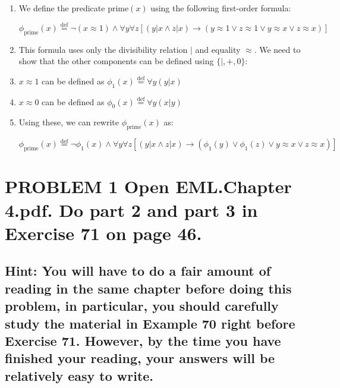 \documentclass{article}
\newenvironment{proof}
{\begin{mdframed}[linewidth=0.5pt]\begin{enumerate}[label=\arabic*.,leftmargin=*]}
{\end{enumerate}\end{mdframed}}
\newcommand{\defeq}{\stackrel{\text{def}}{=}}
\begin{document}
\begin{proof}
    \item We define the predicate $\text{prime}(x)$ using the following first-order formula:
    
    \[\phi_{\text{prime}}(x) \defeq \neg(x \approx 1) \wedge \forall y \forall z [(y|x \wedge z|x) \to (y \approx 1 \vee z \approx 1 \vee y \approx x \vee z \approx x)]\]
    
    \item This formula uses only the divisibility relation $|$ and equality $\approx$. We need to show that the other components can be defined using $\{|, +, 0\}$:
    
    \item $x \approx 1$ can be defined as $\phi_1(x) \defeq \forall y (y|x)$
    
    \item $x \approx 0$ can be defined as $\phi_0(x) \defeq \forall y (x|y)$
    
    \item Using these, we can rewrite $\phi_{\text{prime}}(x)$ as:
    
    \[\phi_{\text{prime}}(x) \defeq \neg\phi_1(x) \wedge \forall y \forall z [(y|x \wedge z|x) \to (\phi_1(y) \vee \phi_1(z) \vee y \approx x \vee z \approx x)]\]
    
  
\end{proof}



\newpage
\section*{PROBLEM 1 Open EML.Chapter 4.pdf. Do part 2 and part 3 in Exercise 71 on page 46.}

\subsection*{Hint: You will have to do a fair amount of reading in the same chapter before doing this problem, in
particular, you should carefully study the material in Example 70 right before Exercise 71. However,
by the time you have finished your reading, your answers will be relatively easy to write.
}
\end{document}
